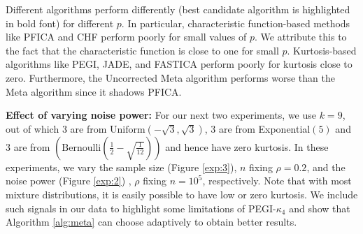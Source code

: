 \documentclass[letterpaper]{article}
\newcommand{\bb}[1]{\left(#1\right)}
\begin{document}
Different algorithms perform differently (best candidate algorithm is highlighted in bold font) for different $p$. In particular, characteristic function-based methods like PFICA and CHF perform poorly for small values of $p$. We attribute this to the fact that the characteristic function is close to one for small $p$. Kurtosis-based algorithms like PEGI, JADE, and FASTICA perform poorly for kurtosis close to zero. Furthermore, the Uncorrected Meta algorithm performs worse than the Meta algorithm since it shadows PFICA.

\textbf{Effect of varying noise power:}
For our next two experiments, we use $k=9$, out of which 3 are from $\text{Uniform}\bb{-\sqrt{3},\sqrt{3}}$, 3 are from Exponential$(5)$ and 3 are from $\bb{\text{Bernoulli}\bb{\frac{1}{2} - \sqrt{\frac{1}{12}}}}$ and hence have zero kurtosis. In these experiments, we vary the sample size (Figure \ref{exp:3}), $n$ fixing $\rho=0.2$, and the noise power (Figure \ref{exp:2}) , $\rho$ fixing $n=10^5$, respectively. Note that with most mixture distributions, it is easily possible to have low or zero kurtosis. We include such signals in our data to highlight some limitations of PEGI-$\kappa_{4}$ and show that Algorithm \ref{alg:meta} can choose adaptively to obtain better results.
\end{document}

